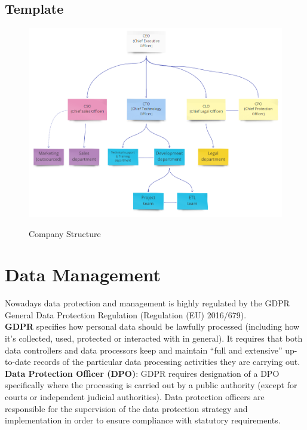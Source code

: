 \documentclass[../main.tex]{subfiles}
\begin{document}
    \subsection{Template}
    \begin{figure}[H]
        \centering
        \includegraphics[scale = 0.6]{assets/company.png} \\
        \caption[]{Company Structure}\label{fig:figure13}
    \end{figure}
    \newpage
    \section{Data Management}
    Nowadays data protection and management is highly regulated by the GDPR General Data Protection Regulation (Regulation (EU) 2016/679).\\
    \textbf{GDPR} specifies how personal data should be lawfully processed (including how it’s collected, used, protected or interacted with in general).
    It requires that both data controllers and data processors keep and maintain “full and extensive” up-to-date records of the particular data processing activities they are carrying out.\\
    \textbf{Data Protection Officer (DPO)}: GDPR requires designation of a DPO specifically where the processing is carried out by a public authority (except for courts or independent judicial authorities).
    Data protection officers are responsible for the supervision of the data protection strategy and implementation in order to ensure compliance with statutory requirements.
\end{document}
